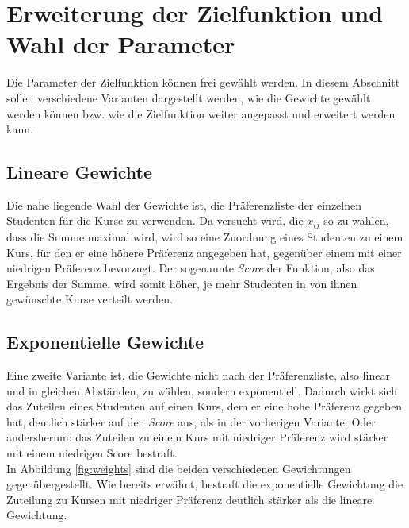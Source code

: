     \section{Erweiterung der Zielfunktion und Wahl der Parameter}
        Die Parameter der Zielfunktion können frei gewählt werden.
        In diesem Abschnitt sollen verschiedene Varianten dargestellt werden, wie die Gewichte gewählt werden können bzw. wie die Zielfunktion weiter angepasst und erweitert werden kann.
        
        \subsection{Lineare Gewichte}
            Die nahe liegende Wahl der Gewichte ist, die Präferenzliste der einzelnen Studenten für die Kurse zu verwenden.
            Da versucht wird, die $ x_{ij} $ so zu wählen, dass die Summe maximal wird, wird so eine Zuordnung eines Studenten zu einem Kurs, für den er eine höhere Präferenz angegeben hat, gegenüber einem mit einer niedrigen Präferenz bevorzugt.
            Der sogenannte \textit{Score} der Funktion, also das Ergebnis der Summe, wird somit höher, je mehr Studenten in von ihnen gewünschte Kurse verteilt werden.
            
        \subsection{Exponentielle Gewichte}
            Eine zweite Variante ist, die Gewichte nicht nach der Präferenzliste, also linear und in gleichen Abständen, zu wählen, sondern exponentiell.
            Dadurch wirkt sich das Zuteilen eines Studenten auf einen Kurs, dem er eine hohe Präferenz gegeben hat, deutlich stärker auf den \textit{Score} aus, als in der vorherigen Variante.
            Oder andersherum: das Zuteilen zu einem Kurs mit niedriger Präferenz wird stärker mit einem niedrigen Score bestraft.\\
            
            In Abbildung \ref{fig:weights} sind die beiden verschiedenen Gewichtungen gegenübergestellt.
            Wie bereits erwähnt, bestraft die exponentielle Gewichtung die Zuteilung zu Kursen mit niedriger Präferenz deutlich stärker als die lineare Gewichtung.
            
